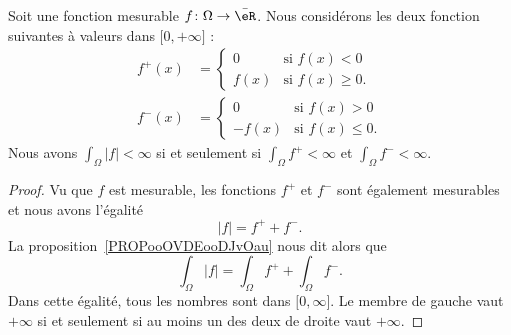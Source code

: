 \begin{proposition}  \label{DefTCXooAstMYl}	\label{PROPooPVBTooFZEZCK}
	Soit une fonction mesurable \( f\colon \Omega\to  \bar \eR \). Nous considérons les deux fonction suivantes à valeurs dans \( \mathopen[ 0 , +\infty \mathclose]\) :
	\begin{subequations}
		\begin{align}
			f^+(x) & =\begin{cases}
				          0    & \text{si } f(x)<0      \\
				          f(x) & \text{si } f(x)\geq 0.
			          \end{cases}  \\
			f^-(x) & =\begin{cases}
				          0     & \text{si } f(x)>0      \\
				          -f(x) & \text{si } f(x)\leq 0.
			          \end{cases}
		\end{align}
	\end{subequations}
	Nous avons \( \int_{\Omega}| f |<\infty\) si et seulement si \( \int_{\Omega} f^+<\infty  \) et \( \int_{\Omega}f^-<\infty\).
\end{proposition}

\begin{proof}
	Vu que \( f\) est mesurable, les fonctions \( f^+\) et \( f^-\) sont également mesurables et nous avons l'égalité
	\begin{equation}
		| f |=f^++f^-.
	\end{equation}
	La proposition~\ref{PROPooOVDEooDJvOau} nous dit alors que
	\begin{equation}
		\int_{\Omega} | f |=\int_{\Omega}f^++\int_{\Omega}f^-.
	\end{equation}
	Dans cette égalité, tous les nombres sont dans \( \mathopen[ 0 , \infty \mathclose]\). Le membre de gauche vaut \( +\infty\) si et seulement si au moins un des deux de droite vaut \( +\infty\).
\end{proof}

